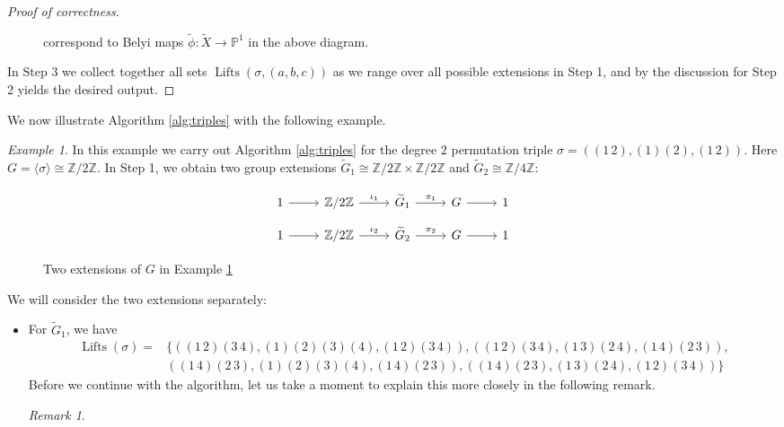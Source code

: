 \documentclass{dcthesis}
\newcommand{\PP}{\mathbb P}
\newcommand{\ZZ}{\mathbb Z}
\newcommand{\wt}[1]{\widetilde{#1}}
\DeclareMathOperator{\Lifts}{Lifts}
\theoremstyle{definition}
\theoremstyle{remark}
\newtheorem{remark}[prop]{Remark}
\newtheorem{example}[prop]{Example}
\numberwithin{equation}{section}
\numberwithin{figure}{section}
\begin{document}
{{\begin{proof}[Proof of correctness]
\begin{figure}[ht]
{          correspond to Belyi maps $\wt{\phi}:\wt{X}\to\PP^1$
          in the above diagram.
        }
        \label{fig:liftbelyimap}
      \end{figure}
      In Step 3 we collect together all sets $\Lifts(\sigma, (a,b,c))$
      as we range over all possible extensions in Step 1,
      and by the discussion for Step 2 yields the desired output.
    \end{proof}
    We now illustrate Algorithm \ref{alg:triples}
    with the following example.
    \begin{example}\label{exm:lift}
      In this example we carry out Algorithm \ref{alg:triples} for
      the degree $2$ permutation triple
      $\sigma = ((1\,2),(1)(2),(1\,2))$.
      Here $G = \langle\sigma\rangle\cong\ZZ/2\ZZ$.
      In Step 1,
      we obtain two group extensions
      $\wt{G}_1\cong\ZZ/2\ZZ\times\ZZ/2\ZZ$
      and
      $\wt{G}_2\cong\ZZ/4\ZZ$:
      \begin{figure}[ht]
        \[
          \begin{tikzcd}[ampersand replacement=\&, row sep = small]
            1\arrow{r}\&\ZZ/2\ZZ\arrow{r}{\iota_1}\&\wt{G}_1\arrow{r}{\pi_1}\&G\arrow{r}\&1
          \end{tikzcd}
        \]
        \[
          \begin{tikzcd}[ampersand replacement=\&, row sep = small]
            1\arrow{r}\&\ZZ/2\ZZ\arrow{r}{\iota_2}\&\wt{G}_2\arrow{r}{\pi_2}\&G\arrow{r}\&1
          \end{tikzcd}
        \]
        \caption{Two extensions of $G$ in Example \ref{exm:lift}}
        \label{fig:liftexampleextensions}
      \end{figure}
      We will consider the two extensions separately:
      \begin{itemize}
        \item
          For $\wt{G}_1$, we have
          \begin{align*}
            \Lifts(\sigma) =
            &\Big\{
              ((1\,2)(3\,4), (1)(2)(3)(4), (1\,2)(3\,4)),
              ((1\,2)(3\,4), (1\,3)(2\,4), (1\,4)(2\,3)),\\
            &((1\,4)(2\,3), (1)(2)(3)(4), (1\,4)(2\,3)),
              ((1\,4)(2\,3), (1\,3)(2\,4), (1\,2)(3\,4))
            \Big\}
          \end{align*}
          Before we continue with the algorithm,
          let us take a moment to explain this more closely in the following remark.
          \begin{remark}\label{rem:actiononblocks}

\end{remark}
\end{itemize}
\end{example}}}
\end{document}
